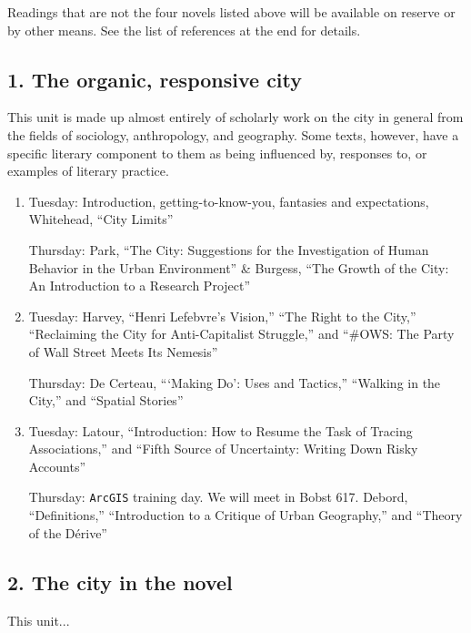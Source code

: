 Readings that are not the four novels listed above will be available on reserve
or by other means. See the list of references at the end for details.

\subsection*{1. The organic, responsive city}

  This unit is made up almost entirely of scholarly work on the city in general
  from the fields of sociology, anthropology, and geography. Some texts,
  however, have a specific literary component to them as being influenced by,
  responses to, or examples of literary practice. 

\begin{enumerate}

  \item Tuesday: Introduction, getting-to-know-you, fantasies and expectations,
    Whitehead, “City Limits”

    Thursday: Park, “The City: Suggestions for the Investigation of Human Behavior in the Urban Environment” \& Burgess, “The Growth of the City: An Introduction to a Research Project”

  \item Tuesday: Harvey, “Henri Lefebvre’s Vision,” “The Right to the City,” “Reclaiming the City for Anti-Capitalist Struggle,” and “\#OWS: The Party of Wall Street Meets Its Nemesis”

    Thursday: De Certeau, “‘Making Do’: Uses and Tactics,” “Walking in the City,” and “Spatial Stories”

  \item Tuesday: Latour, “Introduction: How to Resume the Task of Tracing Associations,” and “Fifth Source of Uncertainty: Writing Down Risky Accounts”

    Thursday: \texttt{ArcGIS} training day. We will meet in Bobst 617. Debord, “Definitions,” “Introduction to a Critique of Urban Geography,” and “Theory of the Dérive”

\end{enumerate}

\subsection*{2. The city in the novel}

This unit...

